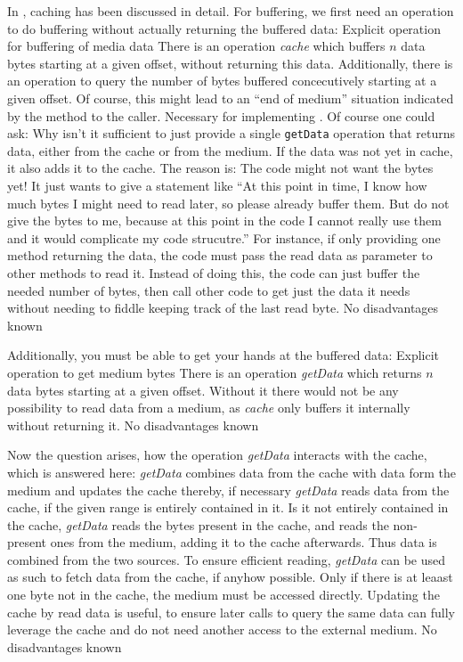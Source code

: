 In , caching has been discussed in detail. For buffering, we first need an operation to do buffering without actually returning the buffered data:
{%
Explicit operation for buffering of media data
}
{%
There is an operation \emph{cache} which buffers $n$ data bytes starting at a given offset, without returning this data. Additionally, there is an operation to query the number of bytes buffered concecutively starting at a given offset. Of course, this might lead to an ``end of medium'' situation indicated by the method to the caller.
}
{%
Necessary for implementing . Of course one could ask: Why isn't it sufficient to just provide a single \texttt{getData} operation that returns data, either from the cache or from the medium. If the data was not yet in cache, it also adds it to the cache. The reason is: The code might not want the bytes yet! It just wants to give a statement like ``At this point in time, I know how much bytes I might need to read later, so please already buffer them. But do not give the bytes to me, because at this point in the code I cannot really use them and it would complicate my code strucutre.'' For instance, if only providing one method returning the data, the code must pass the read data as parameter to other methods to read it. Instead of doing this, the code can just buffer the needed number of bytes, then call other code to get just the data it needs without needing to fiddle keeping track of the last read byte.
}
{%
No disadvantages known
}

Additionally, you must be able to get your hands at the buffered data:
{%
Explicit operation to get medium bytes
}
{%
There is an operation \emph{getData} which returns $n$ data bytes starting at a given offset.
}
{%
Without it there would not be any possibility to read data from a medium, as \emph{cache} only buffers it internally without returning it.
}
{%
No disadvantages known
}

Now the question arises, how the operation \emph{getData} interacts with the cache, which is answered here:
{%
\emph{getData} combines data from the cache with data form the medium and updates the cache thereby, if necessary
}
{%
\emph{getData} reads data from the cache, if the given range is entirely contained in it. Is it not entirely contained in the cache, \emph{getData} reads the bytes present in the cache, and reads the non-present ones from the medium, adding it to the cache afterwards. Thus data is combined from the two sources.
}
{%
To ensure efficient reading, \emph{getData} can be used as such to fetch data from the cache, if anyhow possible. Only if there is at leaast one byte not in the cache, the medium must be accessed directly. Updating the cache by read data is useful, to ensure later calls to query the same data can fully leverage the cache and do not need another access to the external medium.
}
{%
No disadvantages known
}

